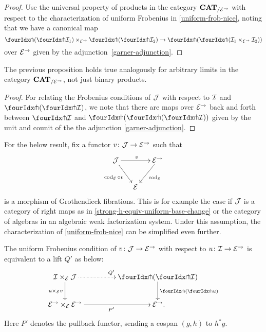 \documentclass[reqno,10pt,a4paper,oneside,draft]{amsart}
\begin{document}
\begin{proof}
Use the universal property of products in the category $\CAT_{/\cal{E}^\to}$ with respect to the characterization of uniform Frobenius in \cref{uniform-frob-nice}, noting that we have a canonical map
\[
\liftl{(\liftr{\cal{I}_1})} \times_{\cal{E}^\to} \liftl{(\liftr{\cal{I}_2})} \to \liftl{(\liftr{(\cal{I}_1 \times_{\cal{E}^\to} \cal{I}_2)})}
\]
over $\cal{E}^\to$ given by the adjunction~\eqref{garner-adjunction}.
\end{proof}

\begin{remark} \label{uniform-frobenius-limit-u}
The previous proposition holds true analogously for arbitrary limits in the category $\CAT_{/\cal{E}^\to}$, not just binary products.
\end{remark}

\begin{proof}
For relating the Frobenius conditions of $\cal{J}$ with respect to $\cal{I}$ and $\liftl{(\liftr{\cal{I}})}$, we note that there are maps over $\cal{E}^\to$ back and forth between $\liftr{\cal{I}}$ and $\liftr{(\liftl{(\liftr{\cal{I}})})}$ given by the unit and counit of the the adjunction \eqref{garner-adjunction}.
\end{proof}

For the below result, fix a functor $v \co \cal{J} \to \cal{E}^\to$ such that
\begin{equation} \label{uniform-frob:comprehension}
\begin{gathered}
\xymatrix@C-1em{
  \cal{J}
  \ar[rr]^{v}
  \ar[dr]_{\cod_{\cal{E}} \cc v}
&&
  \cal{E}^\to
  \ar[dl]^{\cod_{\cal{E}}}
\\&
  \cal{E}
}
\end{gathered}
\end{equation}
is a morphism of Grothendieck fibrations.
This is for example the case if $\cal{J}$ is a category of right maps as in \cref{strong-h-equiv-uniform-base-change} or the category of algebras in an algebraic weak factorization system.
Under this assumption, the characterization of \cref{uniform-frob-nice} can be simplified even further.

\begin{proposition}
\label{uniform-frob-even-nicer}
The uniform Frobenius condition of $v \co \cal{J} \to \cal{E}^\to$ with respect to $u \co \cal{I} \to \cal{E}^\to$ is equivalent to a lift $Q'$ as below:
\begin{equation} \label{uniform-frob-even-nicer:lift}
\begin{gathered}
\xymatrix@C+2em{
  \cal{I} \times_{\cal{E}} \cal{J}
  \ar@{.>}[r]^{Q'}
  \ar[d]_{u \times_{\cal{E}} v}
&
  \liftl{(\liftr{\cal{I}})}
  \ar[d]^{\liftl{(\liftr{u})}}
\\
  \cal{E}^\to \times_{\cal{E}} \cal{E}^\to
  \ar[r]_{P'}
&
  \cal{E}^\to
\rlap{.}}
\end{gathered}
\end{equation}
Here $P'$ denotes the pullback functor, sending a cospan $(g, h)$ to $h^* g$.
\end{proposition}
\end{document}
